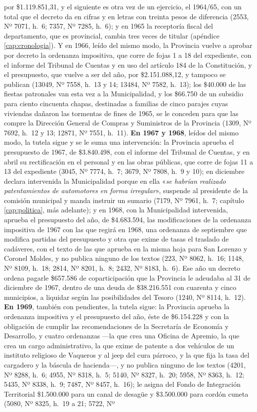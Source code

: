 por \$1.119.851,31, y el siguiente es otra vez de un ejercicio, el 1964/65, con un total que el decreto da en cifras y en letras con treinta pesos de diferencia (2553, Nº 7071, h.\ 6; 7357, Nº 7285, h.\ 6); y en 1965 la receptoría fiscal del departamento, que es provincial, cambia tres veces de titular (apéndice \ref{cap:cronologia}). Y en 1966, leído del mismo modo, la Provincia vuelve a aprobar por decreto la ordenanza impositiva, que corre de fojas 1 a 18 del expediente, con el informe del Tribunal de Cuentas y en uso del artículo 184 de la Constitución, y el presupuesto, que vuelve a ser del año, por \$2.151.088,12, y tampoco se publican (13049, Nº 7558, h.\ 13 y 14; 13484, Nº 7582, h.\ 13); los \$40.000 de las fiestas patronales van esta vez a la Municipalidad, y los \$66.750 de un subsidio para ciento cincuenta chapas, destinadas a familias de cinco parajes cuyas viviendas dañaron las tormentas de fines de 1965, se le conceden para que las compre la Dirección General de Compras y Suministros de la Provincia (1309, Nº 7692, h.\ 12 y 13; 12871, Nº 7551, h.\ 11). \textbf{En 1967 y 1968}, leídos del mismo modo, la tutela sigue y se le suma una intervención: la Provincia aprueba el presupuesto de 1967, de \$3.840.498, con el informe del Tribunal de Cuentas, y en abril su rectificación en el personal y en las obras públicas, que corre de fojas 11 a 13 del expediente (3045, Nº 7774, h.\ 7; 3679, Nº 7808, h.\ 9 y 10); en diciembre declara intervenida la Municipalidad porque en ella «\textit{se habrían realizado patentamientos de automotores en forma irregular}», suspende al presidente de la comisión municipal y manda instruir un sumario (7179, Nº 7961, h.\ 7; capítulo \ref{cap:politica}, más adelante); y en 1968, con la Municipalidad intervenida, aprueba el presupuesto del año, de \$4.683.594, las modificaciones de la ordenanza impositiva de 1967 con las que regirá en 1968, una ordenanza de septiembre que modifica partidas del presupuesto y otra que exime de tasas el traslado de cadáveres, con el texto de las que aprueba en la misma hoja para San Lorenzo y Coronel Moldes, y no publica ninguno de los textos (223, Nº 8062, h.\ 16; 1148, Nº 8109, h.\ 18; 2814, Nº 8201, h.\ 8; 2432, Nº 8183, h.\ 6). Ese año un decreto ordena pagarle \$657.586 de coparticipación que la Provincia le adeudaba al 31 de diciembre de 1967, dentro de una deuda de \$38.216.551 con cuarenta y cinco municipios, a liquidar según las posibilidades del Tesoro (1240, Nº 8114, h.\ 12). \textbf{En 1969}, también con pendientes, la tutela sigue: la Provincia aprueba la ordenanza impositiva y el presupuesto del año, éste de \$6.154.228 y con la obligación de cumplir las recomendaciones de la Secretaría de Economía y Desarrollo, y cuatro ordenanzas ---la que crea una Oficina de Apremio, la que crea un cargo administrativo, la que exime de patente a dos vehículos de un instituto religioso de Vaqueros y al jeep del cura párroco, y la que fija la tasa del cargadero y la báscula de hacienda---, y no publica ninguno de los textos (4201, Nº 8288, h.\ 6; 4955, Nº 8318, h.\ 5; 5140, Nº 8327, h.\ 20; 5958, Nº 8363, h.\ 12; 5435, Nº 8338, h.\ 9; 7487, Nº 8457, h.\ 16); le asigna del Fondo de Integración Territorial \$1.500.000 para un canal de desagüe y \$3.500.000 para cordón cuneta (5080, Nº 8325, h.\ 19 a 21; 5722, Nº 